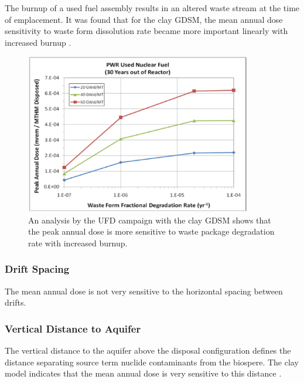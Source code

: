 The burnup of a used fuel assembly results in an altered waste stream at the 
time of emplacement. It was found that for the clay \gls{GDSM}, the mean 
annual dose sensitivity to waste form dissolution rate became more important 
linearly with increased burnup \cite{clayton_generic_2011}.


\begin{figure}[h!]
  \begin{center}
    \includegraphics[height=7cm]{./chapters/current/BUandWPdeg.eps}
  \end{center}
  \caption{An analysis by the UFD campaign with the clay GDSM shows that
  the peak annual dose is more sensitive to waste package degradation rate with 
  increased burnup\cite{clayton_generic_2011}.}
  \label{fig:BUandWPdeg}
\end{figure}
\clearpage

\subsubsection{Drift Spacing}

The mean annual dose is not very sensitive to the horizontal spacing between 
drifts. 

\subsubsection{Vertical Distance to Aquifer}

The vertical distance to the aquifer above the disposal configuration defines 
the distance separating source term nuclide contaminants from the biospere. The 
clay model indicates that the mean annual dose is very sensitive to this 
distance \cite{clayton_generic_2011}.

